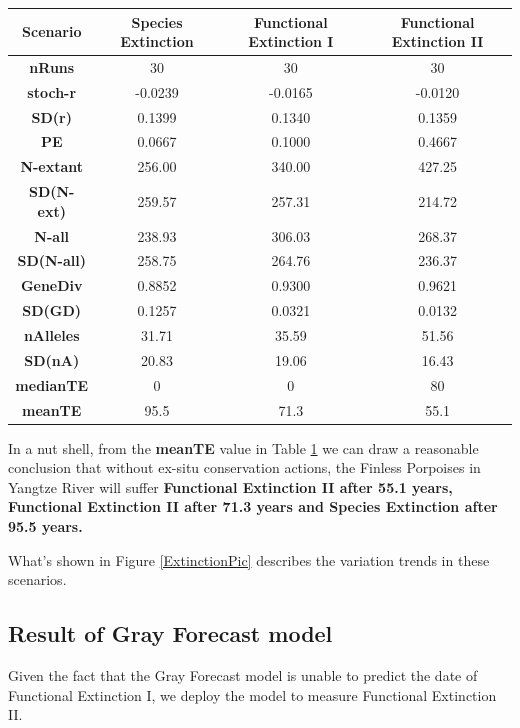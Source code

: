 \documentclass{mcmthesis}
\numberwithin{figure}{section}
\numberwithin{table}{section}
\numberwithin{equation}{section}
\begin{document}
\begin{table}[htbp]\label{Vortex_result_2}
  \centering
  \begin{tabular}{
  >{\columncolor[HTML]{ddebf7}}c |ccc}
  \textbf{Scenario} &
    \cellcolor[HTML]{ddebf7}\textbf{Species Extinction} &
    \cellcolor[HTML]{ddebf7}\textbf{Functional Extinction I} &
    \cellcolor[HTML]{ddebf7}\textbf{Functional Extinction II} \\ \hline
  \textbf{nRuns}     & 30      & 30      & 30      \\
  \textbf{stoch-r}   & -0.0239 & -0.0165 & -0.0120 \\
  \textbf{SD(r)}     & 0.1399  & 0.1340  & 0.1359  \\
  \textbf{PE}        & 0.0667  & 0.1000  & 0.4667  \\
  \textbf{N-extant}  & 256.00  & 340.00  & 427.25  \\
  \textbf{SD(N-ext)} & 259.57  & 257.31  & 214.72  \\
  \textbf{N-all}     & 238.93  & 306.03  & 268.37  \\
  \textbf{SD(N-all)} & 258.75  & 264.76  & 236.37  \\
  \textbf{GeneDiv}   & 0.8852  & 0.9300  & 0.9621  \\
  \textbf{SD(GD)}    & 0.1257  & 0.0321  & 0.0132  \\
  \textbf{nAlleles}  & 31.71   & 35.59   & 51.56   \\
  \textbf{SD(nA)}    & 20.83   & 19.06   & 16.43   \\
  \textbf{medianTE}  & 0       & 0       & 80      \\
  \textbf{meanTE}    & 95.5    & 71.3    & 55.1   
  \end{tabular}
\end{table}

In a nut shell, from the \textbf{meanTE} value in Table \ref{Vortex_result_2}
we can draw a reasonable conclusion that without ex-situ conservation actions, 
the Finless Porpoises in Yangtze River will suffer \textbf{Functional Extinction II after 
55.1 years, Functional Extinction II after 71.3 years and Species Extinction
after 95.5 years.}

What's shown in Figure \ref{ExtinctionPic} describes the variation trends in these scenarios.




\subsection{Result of Gray Forecast model}
Given the fact that the Gray Forecast model is unable to predict the date of
Functional Extinction I, we deploy the model to measure Functional Extinction II. 
\end{document}
